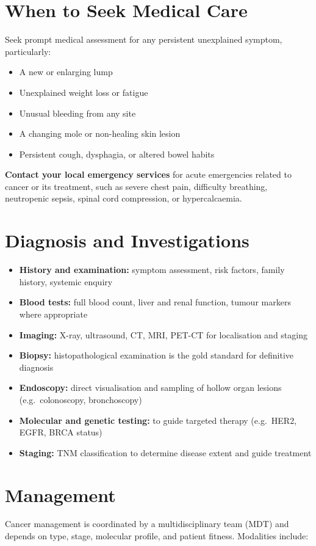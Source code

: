 \section*{When to Seek Medical Care}
Seek prompt medical assessment for any persistent unexplained symptom, particularly:
\begin{itemize}
    \item A new or enlarging lump
    \item Unexplained weight loss or fatigue
    \item Unusual bleeding from any site
    \item A changing mole or non-healing skin lesion
    \item Persistent cough, dysphagia, or altered bowel habits
\end{itemize}

\textbf{Contact your local emergency services} for acute emergencies related to cancer or its treatment, such as severe chest pain, difficulty breathing, neutropenic sepsis, spinal cord compression, or hypercalcaemia.

\section*{Diagnosis and Investigations}
\begin{itemize}
    \item \textbf{History and examination:} symptom assessment, risk factors, family history, systemic enquiry
    \item \textbf{Blood tests:} full blood count, liver and renal function, tumour markers where appropriate
    \item \textbf{Imaging:} X-ray, ultrasound, CT, MRI, PET-CT for localisation and staging
    \item \textbf{Biopsy:} histopathological examination is the gold standard for definitive diagnosis
    \item \textbf{Endoscopy:} direct visualisation and sampling of hollow organ lesions (e.g.\ colonoscopy, bronchoscopy)
    \item \textbf{Molecular and genetic testing:} to guide targeted therapy (e.g.\ HER2, EGFR, BRCA status)
    \item \textbf{Staging:} TNM classification to determine disease extent and guide treatment
\end{itemize}

\section*{Management}
Cancer management is coordinated by a multidisciplinary team (MDT) and depends on type, stage, molecular profile, and patient fitness. Modalities include:

